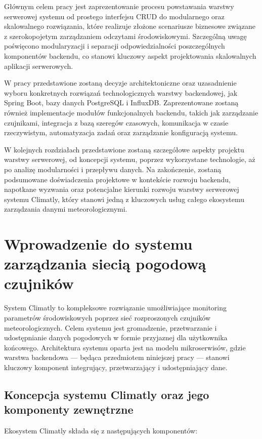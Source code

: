 \documentclass[a4paper,12pt,openany]{book}
\begin{document}
Głównym celem pracy jest zaprezentowanie procesu powstawania warstwy serwerowej systemu od prostego interfejsu CRUD do modularnego oraz skalowalnego rozwiązania, które realizuje złożone scenariusze biznesowe związane z szerokopojetym zarządzaniem odczytami środowiskowymi. Szczególną uwagę poświęcono modularyzacji i separacji odpowiedzialności poszczególnych komponentów backendu, co stanowi kluczowy aspekt projektowania skalowalnych aplikacji serwerowych.

W pracy przedstawione zostaną decyzje architektoniczne oraz uzasadnienie wyboru konkretnych rozwiązań technologicznych warstwy backendowej, jak Spring Boot, bazy danych PostgreSQL i InfluxDB. Zaprezentowane zostaną również implementacje modułów funkcjonalnych backendu, takich jak zarządzanie czujnikami, integracja z bazą szeregów czasowych, komunikacja w czasie rzeczywistym, automatyzacja zadań oraz zarządzanie konfiguracją systemu.

W kolejnych rozdziałach przedstawione zostaną szczegółowe aspekty projektu warstwy serwerowej, od koncepcji systemu, poprzez wykorzystane technologie, aż po analizę modularności i przepływu danych. Na zakończenie, zostaną podsumowane doświadczenia projektowe w kontekście rozwoju backendu, napotkane wyzwania oraz potencjalne kierunki rozwoju warstwy serwerowej systemu Climatly, który stanowi jedną z kluczowych usług całego ekosystemu zarządzania danymi meteorologicznymi.

\chapter{Wprowadzenie do systemu zarządzania siecią pogodową czujników}

System Climatly to kompleksowe rozwiązanie umożliwiające monitoring parametrów środowiskowych poprzez sieć rozproszonych czujników meteorologicznych. Celem systemu jest gromadzenie, przetwarzanie i udostępnianie danych pogodowych w formie przyjaznej dla użytkownika końcowego. Architektura systemu oparta jest na modelu mikroserwisów, gdzie warstwa backendowa --- będąca przedmiotem niniejszej pracy --- stanowi kluczowy komponent integrujący, przetwarzający i udostępniający dane.

\section{Koncepcja systemu Climatly oraz jego komponenty zewnętrzne}

Ekosystem Climatly składa się z następujących komponentów:
\end{document}
